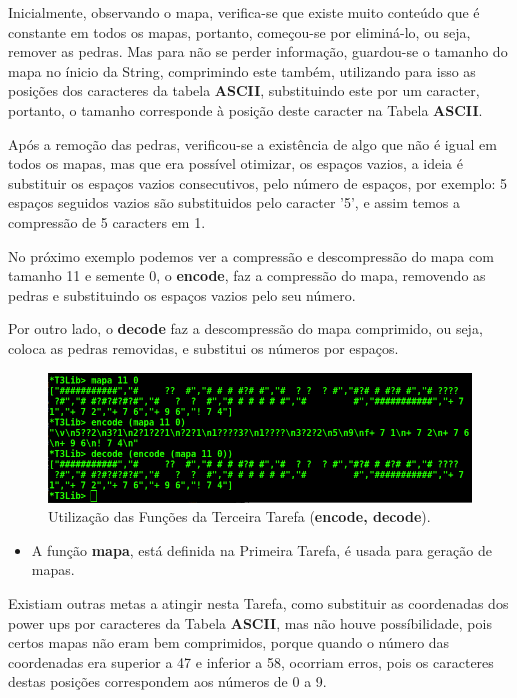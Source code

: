 \documentclass[4apaper]{report}
\begin{document}
Inicialmente, observando o mapa, verifica-se que existe muito conteúdo que é constante em todos os mapas, portanto, começou-se por eliminá-lo, ou seja, remover as pedras. Mas para não se perder informação, guardou-se o tamanho do mapa no ínicio da String, comprimindo este também, utilizando para isso as posições dos caracteres da tabela \textbf{ASCII}, substituindo este por um caracter, portanto, o tamanho corresponde à posição deste caracter na Tabela \textbf{ASCII}. 

Após a remoção das pedras, verificou-se a existência de algo que não é igual em todos os mapas, mas que era possível otimizar, os espaços vazios, a ideia é substituir os espaços vazios consecutivos, pelo número de espaços, por exemplo: 5 espaços seguidos vazios são substituidos pelo caracter '5', e assim temos a compressão de 5 caracters em 1.

No próximo exemplo podemos ver a compressão e descompressão do mapa com tamanho 11 e semente 0, o \textbf{encode}, faz a compressão do mapa, removendo as pedras e substituindo os espaços vazios pelo seu número.

Por outro lado, o \textbf{decode} faz a descompressão do mapa comprimido, ou seja, coloca as pedras removidas, e substitui os números por espaços. 

\begin{figure}[ht]
	\centering
	\includegraphics[scale=0.75]{terminalT3.jpg}
	\caption{Utilização das Funções da Terceira Tarefa (\textbf{encode, decode}).}
	\label{img:terminaT3}
\end{figure}

\begin{itemize}
	\item A função \textbf{mapa}, está definida na Primeira Tarefa, é usada para geração de mapas.
\end{itemize}

Existiam outras metas a atingir nesta Tarefa, como substituir as coordenadas dos power ups por caracteres da Tabela \textbf{ASCII}, mas não houve possíbilidade, pois certos mapas não eram bem comprimidos, porque quando o número das coordenadas era superior a 47 e inferior a 58, ocorriam erros, pois os caracteres destas posições correspondem aos números de 0 a 9. 
\end{document}
